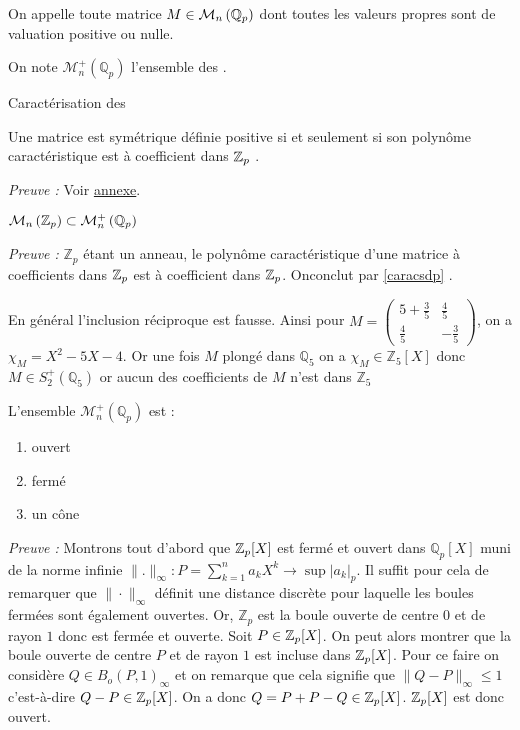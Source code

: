 \begin{definition}
	On appelle \mat toute matrice $M \in \mathcal{M}_n\left( \mathbb{Q}_p \right) $ dont toutes les valeurs propres sont de valuation positive ou nulle.

	On note $ \mathcal{M}_n^+\left( \mathbb{Q}_p \right)$ l'ensemble des \mats.
\end{definition}
\begin{theoreme}
	\label{caracsdp}
	Caractérisation des \mats

	Une matrice est symétrique définie positive si et seulement si son polynôme caractéristique est à coefficient dans $ \mathbb {Z}_p $ .
	
\end{theoreme}
	\textit{Preuve :} Voir \hyperlink{caracsdppreuve}{annexe}.  

\begin{consequence}
	$\mathcal{M}_n \left(  \mathbb {Z}_p  \right) \subset \mathcal{M}_n^+\left( \mathbb{Q}_p \right)$ 
\end{consequence}

\textit{Preuve : }  $\mathbb{Z}_p$ étant un anneau, le polynôme caractéristique d'une matrice à coefficients dans $ \mathbb {Z}_p $ est à coefficient dans $ \mathbb {Z}_p $. Onconclut par \ref{caracsdp} .

\begin{remarque}
	En général l'inclusion réciproque est fausse. Ainsi pour $M = \begin{pmatrix} 5 + \frac{3}{5} & \frac{4}{5} \\ \frac{4}{5} & -\frac{3}{5} \end{pmatrix} $, on a $\chi_M = X^2  - 5 X - 4$. Or une fois $M$ plongé dans $\mathbb{Q}_5$ on a $\chi_M \in \mathbb{Z}_5[X]$ donc $M \in S_2^+\left( \mathbb{Q}_5 \right)$ or aucun des coefficients de $M$ n'est dans $\mathbb{Z}_5 $
\end{remarque}

\begin{propriete}
	L'ensemble $\mathcal{M}_n^+\left( \mathbb{Q}_p \right)$  est :
	\begin{enumerate}[label = \textit{\roman*}.]
		\item ouvert
		\item fermé
		\item un cône
	\end{enumerate}
\end{propriete}

\textit{Preuve :}  
Montrons tout d'abord que $ \mathbb {Z}_p [X]$ est fermé et ouvert dans $\mathbb{Q}_{ p }[X] $ muni de la norme infinie $\|.\|_\infty : P = \sum_{k=1}^{n} a_k X^k \to \sup |a_k|_p$. Il suffit pour cela de remarquer que $\|\cdot \|_\infty$  définit une distance discrète pour laquelle les boules fermées sont également ouvertes. Or, $\mathbb{Z}_p$ est la boule ouverte de centre $0$ et de rayon $1$ donc est fermée et ouverte.
\iffalse
Soit $P \in  \mathbb {Z}_p [X]$. On peut alors montrer que la boule ouverte de centre $P$ et de rayon $1$ est incluse dans $ \mathbb {Z}_p [X]$. Pour ce faire on considère $Q \in B_{o}\left( P,1 \right)_\infty $ et on remarque que cela signifie que $\|Q-P\|_\infty \le 1$ c'est-à-dire $Q-P \in  \mathbb {Z}_p [X]$. On a donc $Q = P + P-Q \in  \mathbb {Z}_p [X]$. 
$ \mathbb {Z}_p [X]$ est donc ouvert.

